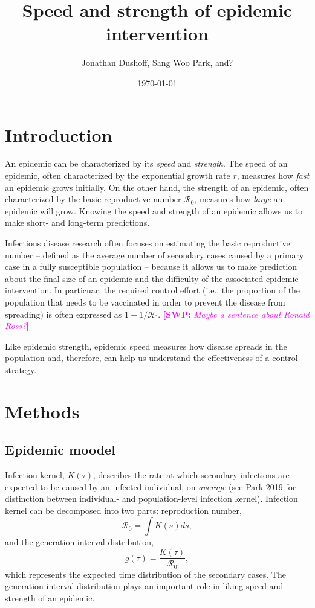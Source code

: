 \documentclass{article}\usepackage[]{graphicx}\usepackage[]{color}
\title{Speed and strength of epidemic intervention}
\author{Jonathan Dushoff, Sang Woo Park, and?}
\date{\today}
\newcommand{\comment}[3]{\textcolor{#1}{\textbf{[#2: }\textit{#3}\textbf{]}}}
\newcommand{\swp}[1]{\comment{magenta}{SWP}{#1}}
\newcommand{\Rx}[1]{\ensuremath{{\mathcal R}_{#1}}}
\newcommand{\Ro}{\Rx{0}}
\begin{document}
\maketitle

\section{Introduction}

An epidemic can be characterized by its \emph{speed} and \emph{strength}.
The speed of an epidemic, often characterized by the exponential growth rate $r$, 
measures how \emph{fast} an epidemic grows initially. On the other hand, the 
strength of an epidemic, often characterized by the basic reproductive number $\Ro$,
measures how \emph{large} an epidemic will grow. Knowing the speed and strength of 
an epidemic allows us to make short- and long-term predictions.

Infectious disease research often focuses on estimating the basic reproductive
number -- defined as the average number of secondary cases caused by a primary 
case in a fully susceptible population -- because it allows us to make 
prediction about the final size of an epidemic and the difficulty of the 
associated epidemic intervention. In particuar, the required control effort 
(i.e., the proportion of the population that needs to be vaccinated in order to
prevent the disease from spreading) is often expressed as $1 - 1/\Ro$. 
\swp{Maybe a sentence about Ronald Ross?}

Like epidemic strength, epidemic speed measures how disease spreads in the population
and, therefore, can help us understand the effectiveness of a control strategy.

\section{Methods}

\subsection{Epidemic moodel}

Infection kernel, $K(\tau)$, describes the rate at which secondary infections are 
expected to be caused by an infected individual, on \emph{average} (see Park 2019
for distinction between individual- and population-level infection kernel). Infection
kernel can be decomposed into two parts: reproduction number, 
$$
\Ro = \int K(s) ds,
$$ 
and the generation-interval distribution, 
$$
g(\tau) = \frac{K(\tau)}{\Ro},
$$
which represents the expected time distribution of the secondary cases. The 
generation-interval distribution plays an important role in liking speed and
strength of an epidemic.
\end{document}
